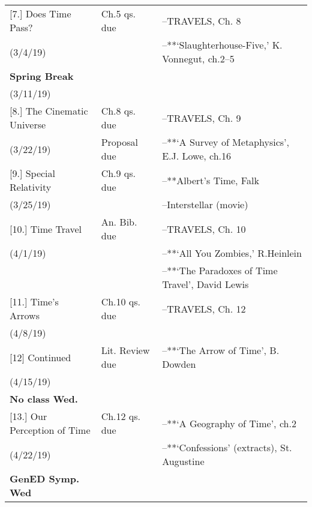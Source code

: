 \documentclass[article,oneside]{memoir}
\begin{document}
\begin{center}
\begin{longtable}{p{4.5cm}p{2.5cm}p{6cm}}
[7.] Does Time Pass?		& Ch.5 qs. due		& --TRAVELS, Ch. 8  \\ 
(3/4/19)			        		&		    	  					&  --**`Slaughterhouse-Five,' K. Vonnegut, ch.2--5 \\  [1.8\baselineskip] 

\textbf{Spring Break}		    		& 		  						&  \\
(3/11/19)			        		&		    		  				&  \\ [1.8\baselineskip]

[8.]   	The Cinematic Universe 	 & Ch.8 qs. due	   		&  --TRAVELS, Ch. 9\\
(3/22/19)				         &  Proposal due			& --**`A Survey of Metaphysics', E.J. Lowe, ch.16  \\[1.8\baselineskip]	

[9.] Special Relativity 		& Ch.9 qs. due		& --**Albert's Time, Falk \\
(3/25/19)				      	&		 & --Interstellar (movie)  \\  [1.8\baselineskip]

[10.] Time Travel			& An. Bib. due			& --TRAVELS, Ch. 10  \\
(4/1/19)		            		&		      & --**`All You Zombies,'  R.Heinlein \\ 
						&			& --**`The Paradoxes of Time Travel', David Lewis \\ [1.8\baselineskip]


[11.] Time's Arrows			& Ch.10 qs. due		& --TRAVELS, Ch. 12 \\
(4/8/19)		 		 &		    	&  \\ [1.8\baselineskip]




[12] Continued		 	& Lit. Review due	& --**`The Arrow of Time', B. Dowden\\
(4/15/19)				&  	 & \\
\textbf{No class Wed.}	&	& \\ [1.8\baselineskip]

[13.] Our Perception of Time 	& Ch.12 qs. due	& --**`A Geography of Time', ch.2\\
(4/22/19)			      		& 				& --**`Confessions' (extracts),  St. Augustine \\ 
\textbf{GenED Symp. Wed}	&				&		\\[1.8\baselineskip]



\end{longtable}
\end{center}
\end{document}

